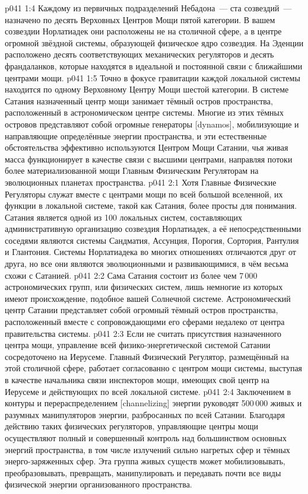 \vs p041 1:4 Каждому из первичных подразделений Небадона~--- ста созвездий~--- назначено по десять Верховных Центров Мощи пятой категории. В вашем созвездии Норлатиадек они расположены не на столичной сфере, а в центре огромной звёздной системы, образующей физическое ядро созвездия. На Эденции расположено десять соответствующих механических регуляторов и десять франдаланков, которые находятся в идеальной и постоянной связи с ближайшими центрами мощи.
\vs p041 1:5 Точно в фокусе гравитации каждой локальной системы находится по одному Верховному Центру Мощи шестой категории. В системе Сатания назначенный центр мощи занимает тёмный остров пространства, расположенный в астрономическом центре системы. Многие из этих тёмных островов представляют собой огромные генераторы [dynamos], мобилизующие и направляющие определённые энергии пространства, и эти естественные обстоятельства эффективно используются Центром Мощи Сатании, чья живая масса функционирует в качестве связи с высшими центрами, направляя потоки более материализованной мощи Главным Физическим Регуляторам на эволюционных планетах пространства.
\vs p041 2:1 Хотя Главные Физические Регуляторы служат вместе с центрами мощи по всей большой вселенной, их функции в локальной системе, такой как Сатания, более просты для понимания. Сатания является одной из 100 локальных систем, составляющих административную организацию созвездия Норлатиадек, а её непосредственными соседями являются системы Сандматия, Ассунция, Порогия, Сортория, Рантулия и Глантония. Системы Норлатиадека во многих отношениях отличаются друг от друга, но все они являются эволюционными и развивающимися, в чём весьма схожи с Сатанией.
\vs p041 2:2 Сама Сатания состоит из более чем 7\,000 астрономических групп, или физических систем, лишь немногие из которых имеют происхождение, подобное вашей Солнечной системе. Астрономический центр Сатании представляет собой огромный тёмный остров пространства, расположенный вместе с сопровождающими его сферами недалеко от центра правительства системы.
\vs p041 2:3 \pc Если не считать присутствия назначенного центра мощи, управление всей физико\hyp{}энергетической системой Сатании сосредоточено на Иерусеме. Главный Физический Регулятор, размещённый на этой столичной сфере, работает согласованно с центром мощи системы, выступая в качестве начальника связи инспекторов мощи, имеющих свой центр на Иерусеме и действующих по всей локальной системе.
\vs p041 2:4 Заключением в контуры и перераспределением [channelizing] энергии руководят 500\,000 живых и разумных манипуляторов энергии, разбросанных по всей Сатании. Благодаря действию таких физических регуляторов, управляющие центры мощи осуществляют полный и совершенный контроль над большинством основных энергий пространства, в том числе излучений сильно нагретых сфер и тёмных энерго\hyp{}заряженных сфер. Эта группа живых существ может мобилизовывать, преобразовывать, превращать, манипулировать и передавать почти все виды физической энергии организованного пространства.
